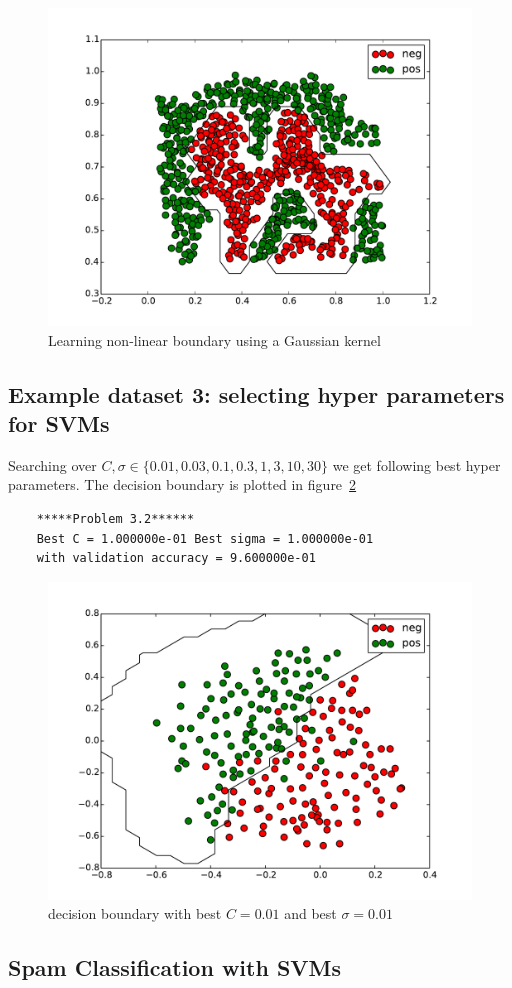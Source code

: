 \documentclass{article}
\begin{document}
\begin{figure}[H]
	\centering
	\includegraphics[width=1\linewidth]{./fig4}
	\caption{Learning non-linear boundary using a Gaussian kernel}\label{fig:3.1_gb}
\end{figure}

\subsection{Example dataset 3: selecting hyper parameters for SVMs}
Searching over $C,\sigma \in \{0.01,0.03,0.1,0.3,1,3,10,30\}$ we get following best hyper parameters.
The decision boundary is plotted in figure~\ref{fig:3.2}
\begin{lstlisting}
	*****Problem 3.2******
	Best C = 1.000000e-01 Best sigma = 1.000000e-01
	with validation accuracy = 9.600000e-01
\end{lstlisting}

\begin{figure}[H]
	\centering
	\includegraphics[width=1\linewidth]{./fig6}
	\caption{decision boundary with best $C=0.01$ and best $\sigma = 0.01$}\label{fig:3.2}
\end{figure}


\subsection{Spam Classification with SVMs}
\end{document}
